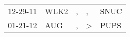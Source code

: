 \begin{supertabular}{lllll}
 12-29-11 &  WLK2 &  , &             , &  SNUC \\
 01-21-12 &   AUG &  , &  \textgreater &  PUPS \\
\end{supertabular}
